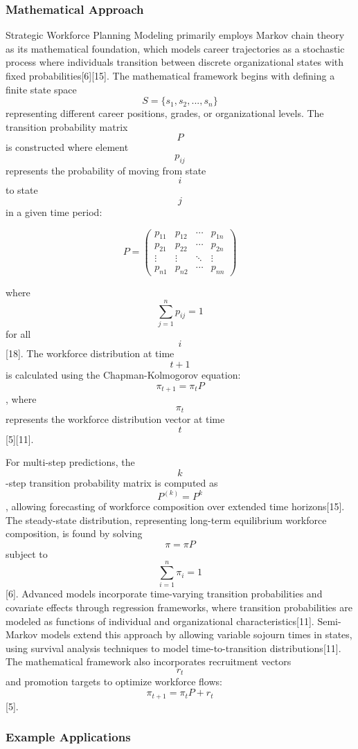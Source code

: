 \documentclass[main.tex]{subfiles}
\begin{document}
\subsubsection{Mathematical Approach}

Strategic Workforce Planning Modeling primarily employs Markov chain theory as its mathematical foundation, which models career trajectories as a stochastic process where individuals transition between discrete organizational states with fixed probabilities[6][15]. The mathematical framework begins with defining a finite state space $$S = \{s_1, s_2, ..., s_n\}$$ representing different career positions, grades, or organizational levels. The transition probability matrix $$P$$ is constructed where element $$p_{ij}$$ represents the probability of moving from state $$i$$ to state $$j$$ in a given time period:

$$P = \begin{pmatrix}
p_{11} & p_{12} & \cdots & p_{1n} \\
p_{21} & p_{22} & \cdots & p_{2n} \\
\vdots & \vdots & \ddots & \vdots \\
p_{n1} & p_{n2} & \cdots & p_{nn}
\end{pmatrix}$$

where $$\sum_{j=1}^n p_{ij} = 1$$ for all $$i$$[18]. The workforce distribution at time $$t+1$$ is calculated using the Chapman-Kolmogorov equation: $$\pi_{t+1} = \pi_t P$$, where $$\pi_t$$ represents the workforce distribution vector at time $$t$$[5][11].

For multi-step predictions, the $$k$$-step transition probability matrix is computed as $$P^{(k)} = P^k$$, allowing forecasting of workforce composition over extended time horizons[15]. The steady-state distribution, representing long-term equilibrium workforce composition, is found by solving $$\pi = \pi P$$ subject to $$\sum_{i=1}^n \pi_i = 1$$[6]. Advanced models incorporate time-varying transition probabilities and covariate effects through regression frameworks, where transition probabilities are modeled as functions of individual and organizational characteristics[11]. Semi-Markov models extend this approach by allowing variable sojourn times in states, using survival analysis techniques to model time-to-transition distributions[11]. The mathematical framework also incorporates recruitment vectors $$r_t$$ and promotion targets to optimize workforce flows: $$\pi_{t+1} = \pi_t P + r_t$$[5].

\subsubsection{Example Applications}
\end{document}
